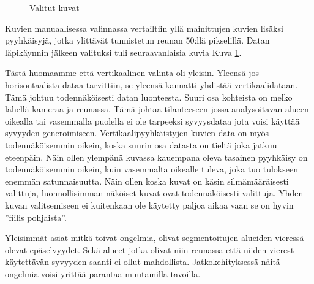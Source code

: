 \begin{figure}[h]
    \centering
    \caption{Valitut kuvat}
    \label{fig:selected}
    \end{figure}


Kuvien manuaalisessa valinnassa vertailtiin yllä mainittujen kuvien lisäksi pyyhkäisyjä,
jotka ylittävät tunnistetun reunan 50:llä pikselillä.
Datan läpikäynnin jälkeen valituksi tuli seuraavanlaisia kuvia Kuva \ref{fig:selected}.


Tästä huomaamme että vertikaalinen valinta oli yleisin.
Yleensä jos horisontaalista dataa tarvittiin, se yleensä kannatti yhdistää vertikaalidataan.
Tämä johtuu todennäköisesti datan luonteesta. Suuri osa kohteista on melko lähellä kameraa ja reunassa.
Tämä johtaa tilanteeseen jossa analysoitavan alueen oikealla tai vasemmalla puolella ei ole tarpeeksi syvyysdataa jota voisi käyttää syvyyden generoimiseen.
Vertikaalipyyhkäistyjen kuvien data on myös todennäköisemmin oikein, koska suurin osa datasta on tieltä joka jatkuu eteenpäin.
Näin ollen ylempänä kuvassa kauempana oleva tasainen pyyhkäisy on todennäköisemmin oikein, kuin vasemmalta oikealle tuleva, joka tuo tulokseen enemmän satunnaisuutta.
Näin ollen koska kuvat on käsin silmämääräisesti valittuja, luonnollisimman näköiset kuvat ovat todennäköisesti valittuja.
Yhden kuvan valitsemiseen ei kuitenkaan ole käytetty paljoa aikaa vaan se on hyvin ”fiilis pohjaista”.

Yleisimmät asiat mitkä toivat ongelmia, olivat segmentoitujen alueiden vieressä olevat epäselvyydet.
Sekä alueet jotka olivat niin reunassa että niiden vierest käytettävän syvyyden saanti ei ollut mahdollista.
Jatkokehityksessä näitä ongelmia voisi yrittää parantaa muutamilla tavoilla. 

